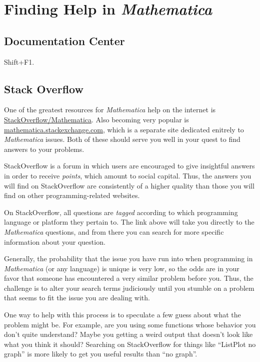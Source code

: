 \chapter{Finding Help in \emph{Mathematica} }
\label{chap:Help}

\section{Documentation Center}

Shift+F1.

\section{Stack Overflow}
One of the greatest resources for \emph{Mathematica} help on the internet is \href{http://stackoverflow.com/questions/tagged/mathematica}{StackOverflow/Mathematica}. Also becoming very popular is \href{http://mathematica.stackexchange.com/}{mathematica.stackexchange.com}, which is a separate site dedicated enitrely to \emph{Mathematica} issues. Both of these should serve you well in your quest to find answers to your problems.

StackOverflow is a forum in which users are encouraged to give insightful answers in order to receive \emph{points}, which amount to social capital. Thus, the answers you will find on StackOverflow are consistently of a higher quality than those you will find on other programming-related websites.

On StackOverflow, all questions are \emph{tagged} according to which programming language or platform they pertain to. The link above will take you directly to the \emph{Mathematica} questions, and from there you can search for more specific information about your question.

Generally, the probability that the issue you have run into when programming in \emph{Mathematica} (or any language) is unique is very low, so the odds are in your favor that someone has encountered a very similar problem before you. Thus, the challenge is to alter your search terms judiciously until you stumble on a problem that seems to fit the issue you are dealing with.

One way to help with this process is to speculate a few guess about what the problem might be. For example, are you using some functions whose behavior you don't quite understand? Maybe you getting a weird output that doesn't look like what you think it should? Searching on StackOverflow for things like ``ListPlot no graph'' is more likely to get you useful results than ``no graph''. 

